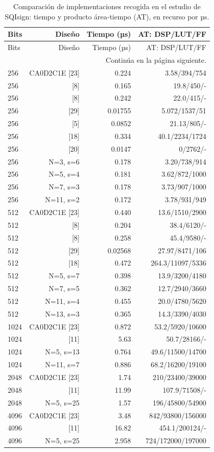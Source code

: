 \begin{longtable}{lrrr}
\caption{Comparación de implementaciones recogida en el estudio de SQIsign: tiempo y producto área-tiempo (AT), en recurso por µs.}\label{tab:eval-sqisign-at}\\
\toprule
Bits & Diseño & Tiempo (µs) & AT: DSP/LUT/FF \\
\midrule
\endfirsthead
\toprule
Bits & Diseño & Tiempo (µs) & AT: DSP/LUT/FF \\
\midrule
\endhead
\midrule
\multicolumn{4}{r}{\small Continúa en la página siguiente.}\\
\endfoot
\bottomrule
\endlastfoot
{256} & {CA0D2C1E [23]} & {0.224} & {3.58/394/754} \\
{256} & {[8]} & {0.165} & {19.8/450/-} \\
{256} & {[8]} & {0.242} & {22.0/415/-} \\
{256} & {[29]} & {0.01755} & {5.072/1537/51} \\
{256} & {[5]} & {0.0852} & {21.13/805/-} \\
{256} & {[18]} & {0.334} & {40.1/2234/1724} \\
{256} & {[20]} & {0.0147} & {0/2762/-} \\
{256} & {N=3, s=6} & {0.178} & {3.20/738/914} \\
{256} & {N=5, s=4} & {0.181} & {3.62/872/1000} \\
{256} & {N=7, s=3} & {0.178} & {3.73/907/1000} \\
{256} & {N=11, s=2} & {0.172} & {3.78/931/949} \\
{512} & {CA0D2C1E [23]} & {0.440} & {13.6/1510/2900} \\
{512} & {[8]} & {0.204} & {38.4/6120/-} \\
{512} & {[8]} & {0.258} & {45.4/9580/-} \\
{512} & {[29]} & {0.02568} & {27.97/8471/106} \\
{512} & {[18]} & {0.472} & {264.3/11097/5336} \\
{512} & {N=5, s=7} & {0.398} & {13.9/3200/4180} \\
{512} & {N=7, s=5} & {0.362} & {12.7/2940/3660} \\
{512} & {N=11, s=4} & {0.455} & {20.0/4780/5620} \\
{512} & {N=13, s=3} & {0.365} & {14.3/3390/4030} \\
{1024} & {CA0D2C1E [23]} & {0.872} & {53.2/5920/10600} \\
{1024} & {[11]} & {5.63} & {50.7/28166/-} \\
{1024} & {N=5, s=13} & {0.764} & {49.6/11500/14700} \\
{1024} & {N=11, s=7} & {0.886} & {68.2/16200/19100} \\
{2048} & {CA0D2C1E [23]} & {1.74} & {210/23400/39000} \\
{2048} & {[11]} & {11.99} & {107.9/71508/-} \\
{2048} & {N=5, s=25} & {1.57} & {196/45800/54900} \\
{4096} & {CA0D2C1E [23]} & {3.48} & {842/93800/156000} \\
{4096} & {[11]} & {16.82} & {454.1/200124/-} \\
{4096} & {N=5, s=25} & {2.958} & {724/172000/197000} \\
\end{longtable}
